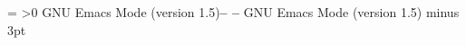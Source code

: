 

\def\version{version 1.5}
\def\versiondate{October 27, 1986}
\headline={
   \ifnum\pageno>0
      \ifodd\pageno
           {\ssl GNU Emacs {\Bsl} Mode (\version)}\hfill{\hss\bf -- \folio\/ --}
      \else {\bf -- \folio\/ --}\hfill{\hss\ssl GNU Emacs {\Bsl} Mode (\version)}
      \fi
   \else\hfill
   \fi}
\parindent=2pc
\parskip=8pt minus 3pt
\nopagenumbers

